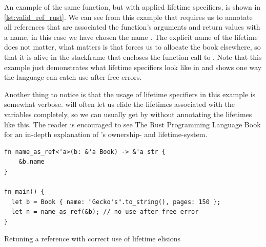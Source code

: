 An example of the same function, but with applied lifetime specifiers, is shown in \autoref{lst:valid_ref_rust}.
We can see from this example that {\rust} requires us to annotate all references that are associated the function's arguments and return values with a name, in this case we have chosen the name .
The explicit name of the lifetime does not matter, what matters is that {\rust} forces us to allocate the book elsewhere, so that it is alive in the stackframe that encloses the function call to .
Note that this example just demonstrates what lifetime specifiers look like in {\rust} and shows one way the language can catch use-after free errors.

Another thing to notice is that the usage of lifetime specifiers in this example is somewhat verbose.
{\rust} will often let us elide the lifetimes associated with the variables completely, so we can usually get by without annotating the lifetimes like this.
The reader is encouraged to see The Rust Programming Language Book \cite{web:rust_book} for an in-depth explanation of {\rust}'s ownership- and lifetime-system.

\begin{listing}[tb]
\begin{verbatim}
fn name_as_ref<'a>(b: &'a Book) -> &'a str {
    &b.name
}

fn main() {
  let b = Book { name: "Gecko's".to_string(), pages: 150 };
  let n = name_as_ref(&b); // no use-after-free error
}
\end{verbatim}
\caption{Retuning a reference with correct use of lifetime elisions}
\label{lst:valid_ref_rust}
\end{listing}



